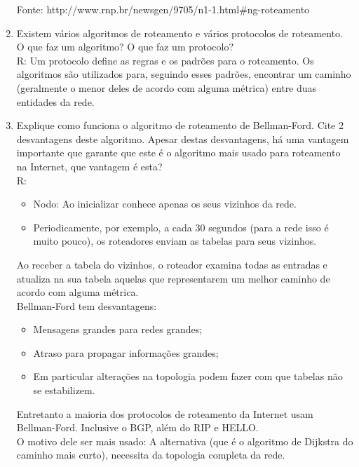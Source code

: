 \documentclass{article}
\begin{document}
\begin{enumerate}
	Fonte: http://www.rnp.br/newsgen/9705/n1-1.html\#ng-roteamento

	
	\item Existem vários algoritmos de roteamento e vários protocolos de roteamento. O que faz um algoritmo? O que faz um protocolo?
	\\
	R:
	Um protocolo define as regras e os padrões para o roteamento. Os algoritmos
	são utilizados para, seguindo esses padrões, encontrar um caminho
	(geralmente o menor deles de acordo com alguma métrica) entre duas entidades da rede.


	
	\item Explique como funciona o algoritmo de roteamento de Bellman-Ford. Cite 2 desvantagens deste algoritmo. Apesar destas desvantagens, há uma vantagem importante que garante que este é o algoritmo mais usado para roteamento na Internet, que vantagem é esta?
	\\
	R:
	\begin{itemize}
		\item Nodo: Ao inicializar conhece apenas os seus vizinhos da rede.
		\item Periodicamente, por exemplo, a cada 30 segundos (para a rede isso é muito pouco), os roteadores enviam as tabelas para seus vizinhos.
	\end{itemize}

Ao receber a tabela do vizinhos, o roteador examina todas as entradas e atualiza na sua tabela aquelas que representarem um melhor caminho de acordo com alguma métrica.\\

Bellman-Ford tem desvantagens:

\begin{itemize}
	\item Mensagens grandes para redes grandes;
	\item Atraso para propagar informações grandes;
	\item Em particular alterações na topologia podem fazer com que tabelas não se estabilizem.
\end{itemize}

Entretanto a maioria dos protocolos de roteamento da Internet usam Bellman-Ford. Inclusive o BGP, além do RIP e HELLO.\\

O motivo dele ser mais usado: A alternativa (que é o algoritmo de Dijkstra do caminho mais curto), necessita da topologia completa da rede.\\


\end{enumerate}
\end{document}
